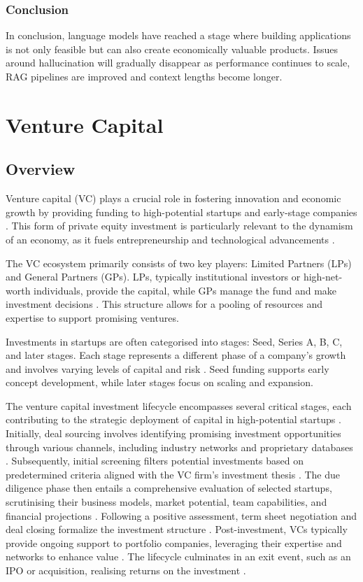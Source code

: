 \documentclass[a4paper, oneside]{discothesis}
\begin{document}
\subsection{Conclusion}
In conclusion, language models have reached a stage where building applications is not only feasible but can also create economically valuable products. Issues around hallucination will gradually disappear as performance continues to scale, RAG pipelines are improved and context lengths become longer.

\chapter{Venture Capital}
\section{Overview}
Venture capital (VC) plays a crucial role in fostering innovation and economic growth by providing funding to high-potential startups and early-stage companies \cite{gompers2001venture}. This form of private equity investment is particularly relevant to the dynamism of an economy, as it fuels entrepreneurship and technological advancements \cite{kortum2000assessing_contribution_venture_capital}.

The VC ecosystem primarily consists of two key players: Limited Partners (LPs) and General Partners (GPs). LPs, typically institutional investors or high-net-worth individuals, provide the capital, while GPs manage the fund and make investment decisions \cite{metrick2010venture}. This structure allows for a pooling of resources and expertise to support promising ventures.

Investments in startups are often categorised into stages: Seed, Series A, B, C, and later stages. Each stage represents a different phase of a company's growth and involves varying levels of capital and risk \cite{hellmann2002venture}. Seed funding supports early concept development, while later stages focus on scaling and expansion.

The venture capital investment lifecycle encompasses several critical stages, each contributing to the strategic deployment of capital in high-potential startups \cite{gompers2004venture}. Initially, deal sourcing involves identifying promising investment opportunities through various channels, including industry networks and proprietary databases \cite{sorenson2001syndication}. Subsequently, initial screening filters potential investments based on predetermined criteria aligned with the VC firm's investment thesis \cite{petty1994harvesting}. The due diligence phase then entails a comprehensive evaluation of selected startups, scrutinising their business models, market potential, team capabilities, and financial projections \cite{fried2003venture}. Following a positive assessment, term sheet negotiation and deal closing formalize the investment structure \cite{kaplan2003financial, cumming2006contracts}. Post-investment, VCs typically provide ongoing support to portfolio companies, leveraging their expertise and networks to enhance value \cite{sapienza1996venture}. The lifecycle culminates in an exit event, such as an IPO or acquisition, realising returns on the investment \cite{cumming2008preplanned}.
\end{document}
